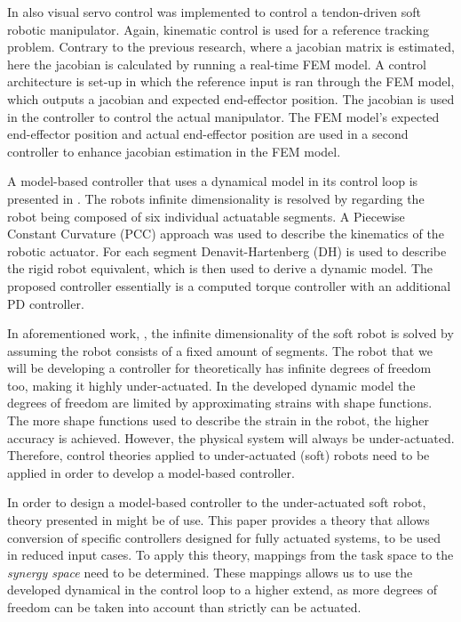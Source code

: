 In \cite{zhang2017visual} also visual servo control was implemented to control a tendon-driven soft robotic manipulator. Again, kinematic control is used for a reference tracking problem. Contrary to the previous research, where a jacobian matrix is estimated, here the jacobian is calculated by running a real-time FEM model. A control architecture is set-up in which the reference input is ran through the FEM model, which outputs a jacobian and expected end-effector position. The jacobian is used in the controller to control the actual manipulator. The FEM model's expected end-effector position and actual end-effector position are used in a second controller to enhance jacobian estimation in the FEM model.

A model-based controller that uses a dynamical model in its control loop is presented in \cite{della2020model}. The robots infinite dimensionality is resolved by regarding the robot being composed of six individual actuatable segments. A Piecewise Constant Curvature (PCC) approach was used to describe the kinematics of the robotic actuator. For each segment Denavit-Hartenberg (DH) is used to describe the rigid robot equivalent, which is then used to derive a dynamic model. The proposed controller essentially is a computed torque controller with an additional PD controller. 

In aforementioned work, \cite{della2020model}, the infinite dimensionality of the soft robot is solved by assuming the robot consists of a fixed amount of segments. The robot that we will be developing a controller for theoretically has infinite degrees of freedom too, making it highly under-actuated. In the developed dynamic model \cite{caasenbrood2020} the degrees of freedom are limited by approximating strains with shape functions. The more shape functions used to describe the strain in the robot, the higher accuracy is achieved. However, the physical system will always be under-actuated. Therefore, control theories applied to under-actuated (soft) robots need to be applied in order to develop a model-based controller.

In order to design a model-based controller to the under-actuated soft robot, theory presented in \cite{della2019exact} might be of use. This paper provides a theory that allows conversion of specific controllers designed for fully actuated systems, to be used in reduced input cases. To apply this theory, mappings from the task space to the \textit{synergy space} need to be determined. These mappings allows us to use the developed dynamical in the control loop to a higher extend, as more degrees of freedom can be taken into account than strictly can be actuated. 

